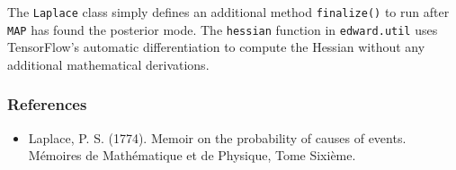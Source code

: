 The \texttt{Laplace} class simply defines an additional method
\texttt{finalize()} to
run after \texttt{MAP} has found the posterior mode. The
\texttt{hessian} function in \texttt{edward.util} uses TensorFlow's
automatic differentiation to compute the Hessian without any
additional mathematical derivations.

\subsubsection{References}\label{references}

\begin{itemize}
\item
  Laplace, P. S. (1774). Memoir on the probability of causes of
  events. Mémoires de Mathématique et de Physique, Tome Sixième.
\end{itemize}
